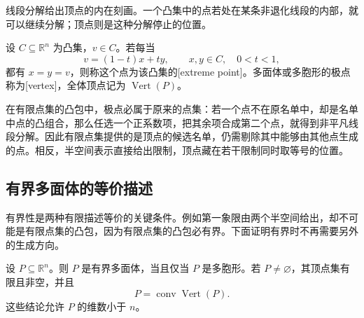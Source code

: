 线段分解给出顶点的内在刻画。一个凸集中的点若处在某条非退化线段的内部，就可以继续分解；顶点则是这种分解停止的位置。

\begin{definition}
	\label{g1:def:extreme-vertex}
	设 \(C\subseteq\mathbb R^n\) 为凸集，\(v\in C\)。若每当
	\[
		v=(1-t)x+ty,\qquad x,y\in C,\quad 0<t<1,
	\]
	都有 \(x=y=v\)，则称这个点为该凸集的[extreme point]。多面体或多胞形的极点称为[vertex]，全体顶点记为 \(\operatorname{Vert}(P)\)。
\end{definition}

在有限点集的凸包中，极点必属于原来的点集：若一个点不在原名单中，却是名单中点的凸组合，那么任选一个正系数项，把其余项合成第二个点，就得到非平凡线段分解。因此有限点集提供的是顶点的候选名单，仍需剔除其中能够由其他点生成的点。相反，半空间表示直接给出限制，顶点藏在若干限制同时取等号的位置。

\subsection{有界多面体的等价描述}
\label{g1:subsec:0303:02}

有界性是两种有限描述等价的关键条件。例如第一象限由两个半空间给出，却不可能是有限点集的凸包，因为有限点集的凸包必有界。下面证明有界时不再需要另外的生成方向。

\begin{theorem}
	\label{g1:thm:polytope-hv}
	设 \(P\subseteq\mathbb R^n\)。则 \(P\) 是有界多面体，当且仅当 \(P\) 是多胞形。若 \(P\ne\varnothing\)，其顶点集有限且非空，并且
	\[
		P=\operatorname{conv}\operatorname{Vert}(P).
	\]
	这些结论允许 \(P\) 的维数小于 \(n\)。
\end{theorem}

